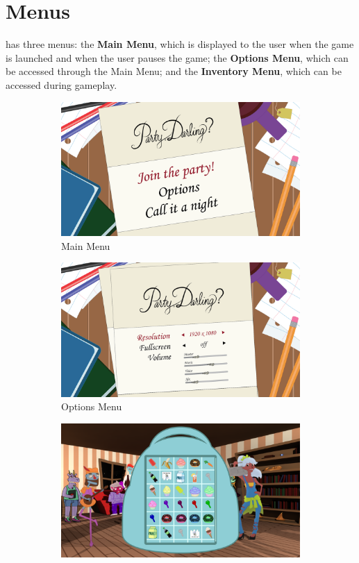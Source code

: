 \section{Menus}
\ourgame{} has three menus: the \textbf{Main Menu}, which is displayed to the user when the game is launched and when the user pauses the game; the \textbf{Options Menu}, which can be accessed through the Main Menu; and the \textbf{Inventory Menu}, which can be accessed during gameplay.

\begin{figure}[htb]
  \centering\begin{subfigure}{.33\textwidth}
    \centering
    \includegraphics[width=.9\linewidth]{images/menu_main}
    \caption{Main Menu}
    \label{fig:menu_main}
  \end{subfigure}
  \begin{subfigure}{.33\textwidth}
    \centering
    \includegraphics[width=.9\linewidth]{images/menu_options}
    \caption{Options Menu}
    \label{fig:menu_options}
  \end{subfigure}
  \begin{subfigure}{.33\textwidth}
    \centering
    \includegraphics[width=.9\linewidth]{images/grid1}

\end{subfigure}
\end{figure}

